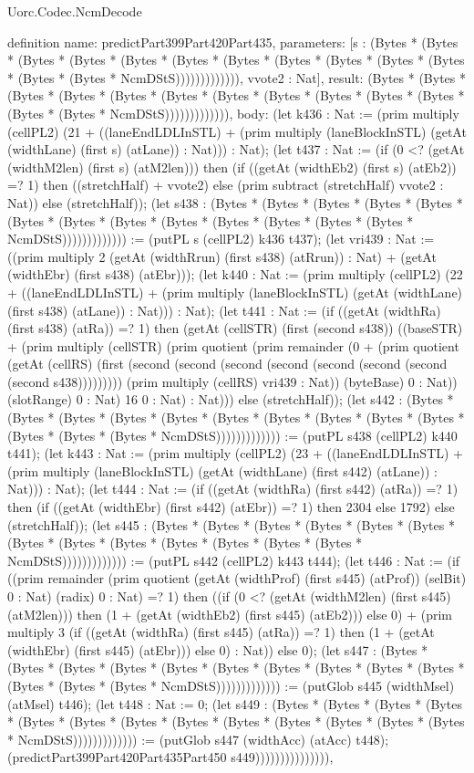 \begin{lexlean}{Uorc.Codec.NcmDecode}
\begin{semanticmodule}
definition{
  name: predictPart399Part420Part435,
  parameters: [s : (Bytes * (Bytes * (Bytes * (Bytes * (Bytes * (Bytes * (Bytes * (Bytes * (Bytes * (Bytes * (Bytes * (Bytes * (Bytes * NcmDStS))))))))))))), vvote2 : Nat],
  result: (Bytes * (Bytes * (Bytes * (Bytes * (Bytes * (Bytes * (Bytes * (Bytes * (Bytes * (Bytes * (Bytes * (Bytes * (Bytes * NcmDStS))))))))))))),
  body: (let k436 : Nat := (prim multiply (cellPL2) (21 + ((laneEndLDLInSTL) + (prim multiply (laneBlockInSTL) (getAt (widthLane) (first s) (atLane)) : Nat))) : Nat); (let t437 : Nat := (if (0 <? (getAt (widthM2len) (first s) (atM2len))) then (if ((getAt (widthEb2) (first s) (atEb2)) =? 1) then ((stretchHalf) + vvote2) else (prim subtract (stretchHalf) vvote2 : Nat)) else (stretchHalf)); (let s438 : (Bytes * (Bytes * (Bytes * (Bytes * (Bytes * (Bytes * (Bytes * (Bytes * (Bytes * (Bytes * (Bytes * (Bytes * (Bytes * NcmDStS))))))))))))) := (putPL s (cellPL2) k436 t437); (let vri439 : Nat := ((prim multiply 2 (getAt (widthRrun) (first s438) (atRrun)) : Nat) + (getAt (widthEbr) (first s438) (atEbr))); (let k440 : Nat := (prim multiply (cellPL2) (22 + ((laneEndLDLInSTL) + (prim multiply (laneBlockInSTL) (getAt (widthLane) (first s438) (atLane)) : Nat))) : Nat); (let t441 : Nat := (if ((getAt (widthRa) (first s438) (atRa)) =? 1) then (getAt (cellSTR) (first (second s438)) ((baseSTR) + (prim multiply (cellSTR) (prim quotient (prim remainder (0 + (prim quotient (getAt (cellRS) (first (second (second (second (second (second (second (second (second s438))))))))) (prim multiply (cellRS) vri439 : Nat)) (byteBase) 0 : Nat)) (slotRange) 0 : Nat) 16 0 : Nat) : Nat))) else (stretchHalf)); (let s442 : (Bytes * (Bytes * (Bytes * (Bytes * (Bytes * (Bytes * (Bytes * (Bytes * (Bytes * (Bytes * (Bytes * (Bytes * (Bytes * NcmDStS))))))))))))) := (putPL s438 (cellPL2) k440 t441); (let k443 : Nat := (prim multiply (cellPL2) (23 + ((laneEndLDLInSTL) + (prim multiply (laneBlockInSTL) (getAt (widthLane) (first s442) (atLane)) : Nat))) : Nat); (let t444 : Nat := (if ((getAt (widthRa) (first s442) (atRa)) =? 1) then (if ((getAt (widthEbr) (first s442) (atEbr)) =? 1) then 2304 else 1792) else (stretchHalf)); (let s445 : (Bytes * (Bytes * (Bytes * (Bytes * (Bytes * (Bytes * (Bytes * (Bytes * (Bytes * (Bytes * (Bytes * (Bytes * (Bytes * NcmDStS))))))))))))) := (putPL s442 (cellPL2) k443 t444); (let t446 : Nat := (if ((prim remainder (prim quotient (getAt (widthProf) (first s445) (atProf)) (selBit) 0 : Nat) (radix) 0 : Nat) =? 1) then ((if (0 <? (getAt (widthM2len) (first s445) (atM2len))) then (1 + (getAt (widthEb2) (first s445) (atEb2))) else 0) + (prim multiply 3 (if ((getAt (widthRa) (first s445) (atRa)) =? 1) then (1 + (getAt (widthEbr) (first s445) (atEbr))) else 0) : Nat)) else 0); (let s447 : (Bytes * (Bytes * (Bytes * (Bytes * (Bytes * (Bytes * (Bytes * (Bytes * (Bytes * (Bytes * (Bytes * (Bytes * (Bytes * NcmDStS))))))))))))) := (putGlob s445 (widthMsel) (atMsel) t446); (let t448 : Nat := 0; (let s449 : (Bytes * (Bytes * (Bytes * (Bytes * (Bytes * (Bytes * (Bytes * (Bytes * (Bytes * (Bytes * (Bytes * (Bytes * (Bytes * NcmDStS))))))))))))) := (putGlob s447 (widthAcc) (atAcc) t448); (predictPart399Part420Part435Part450 s449))))))))))))))),
}
\end{semanticmodule}
\end{lexlean}
